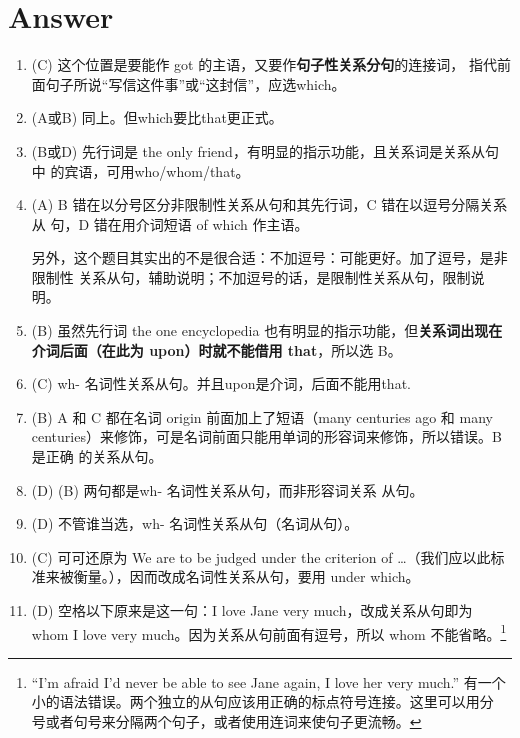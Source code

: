 \section{Answer}
\begin{enumerate}
\item (C) 这个位置是要能作 got 的主语，又要作\textbf{句子性关系分句}的连接词，
  指代前面句子所说“写信这件事”或“这封信”，应选which。


\item (A或B) 同上。但which要比that更正式。

\item (B或D) 先行词是 the only friend，有明显的指示功能，且关系词是关系从句中
  的宾语，可用who/whom/that。

\item (A) B 错在以分号区分非限制性关系从句和其先行词，C 错在以逗号分隔关系从
  句，D 错在用介词短语 of which 作主语。

  另外，这个题目其实出的不是很合适：不加逗号：可能更好。加了逗号，是非限制性
  关系从句，辅助说明；不加逗号的话，是限制性关系从句，限制说明。



\item  (B) 虽然先行词 the one encyclopedia 也有明显的指示功能，但\textbf{关系词出现在介词后面（在此为 upon）时就不能借用 that}，所以选 B。

\item (C) wh- 名词性关系从句。并且upon是介词，后面不能用that.

\item (B) A 和 C 都在名词 origin 前面加上了短语（many centuries ago 和 many
  centuries）来修饰，可是名词前面只能用单词的形容词来修饰，所以错误。B 是正确
  的关系从句。

\item {} (D)  (B) 两句都是wh- 名词性关系从句，而非形容词关系
  从句。

\item (D) 不管谁当选，wh- 名词性关系从句（名词从句）。


\item (C) 可可还原为 We are to be judged under the criterion of
  \ldots（我们应以此标准来被衡量。），因而改成名词性关系从句，要用 under which。


\item (D) 空格以下原来是这一句：I love Jane very much，改成关系从句即为 whom I
  love very much。因为关系从句前面有逗号，所以 whom 不能省略。\footnote{
    “I'm afraid I'd never be able to see Jane again, I love her very much.”
    有一个小的语法错误。两个独立的从句应该用正确的标点符号连接。这里可以用分
    号或者句号来分隔两个句子，或者使用连词来使句子更流畅。

}
\end{enumerate}
